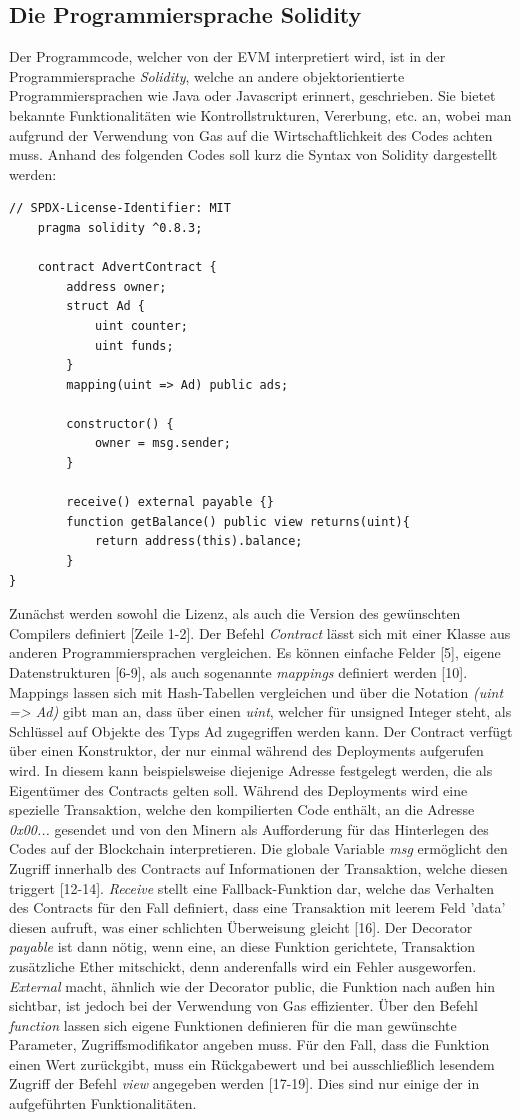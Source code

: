 \subsection{Die Programmiersprache Solidity}
Der Programmcode, welcher von der EVM interpretiert wird, ist in der Programmiersprache \emph{Solidity}, welche an andere objektorientierte Programmiersprachen wie Java oder Javascript erinnert, geschrieben. Sie bietet bekannte Funktionalitäten wie Kontrollstrukturen, Vererbung, etc. an, wobei man aufgrund der Verwendung von Gas auf die Wirtschaftlichkeit des Codes achten muss. Anhand des folgenden Codes soll kurz die Syntax von Solidity dargestellt werden: 
\begin{lstlisting}[caption={Beispielcode für Solidity},captionpos=b]
	// SPDX-License-Identifier: MIT
	pragma solidity ^0.8.3;
	
	contract AdvertContract {
		address owner;
		struct Ad {
			uint counter;
			uint funds;
		}
		mapping(uint => Ad) public ads;
		
		constructor() {
			owner = msg.sender;
		}
	
		receive() external payable {}
		function getBalance() public view returns(uint){
			return address(this).balance;
		}
}
	\end{lstlisting}
Zunächst werden sowohl die Lizenz, als auch die Version des gewünschten Compilers definiert [Zeile 1-2]. Der Befehl \emph{Contract} lässt sich mit einer Klasse aus anderen Programmiersprachen vergleichen. 
Es können einfache Felder [5], eigene Datenstrukturen [6-9], als auch sogenannte \emph{mappings} definiert werden [10]. Mappings lassen sich mit Hash-Tabellen vergleichen und über die Notation \emph{(uint => Ad)} gibt man an, dass über einen \emph{uint}, welcher für unsigned Integer steht, als Schlüssel auf Objekte des Typs Ad zugegriffen werden kann. 
Der Contract verfügt über einen Konstruktor, der nur einmal während des Deployments aufgerufen wird. In diesem kann beispielsweise diejenige Adresse festgelegt werden, die als Eigentümer des Contracts gelten soll. 
Während des Deployments wird eine spezielle Transaktion, welche den kompilierten Code enthält, an die Adresse \emph{0x00...} gesendet und von den Minern als Aufforderung für das Hinterlegen des Codes auf der Blockchain interpretieren. 
Die globale Variable \emph{msg} ermöglicht den Zugriff innerhalb des Contracts auf Informationen der Transaktion, welche diesen triggert [12-14].
\emph{Receive} stellt eine Fallback-Funktion dar, welche das Verhalten des Contracts für den Fall definiert, dass eine Transaktion mit leerem Feld 'data' diesen aufruft, was einer schlichten Überweisung gleicht [16]. Der Decorator \emph{payable} ist dann nötig, wenn eine, an diese Funktion gerichtete, Transaktion zusätzliche Ether mitschickt, denn anderenfalls wird ein Fehler ausgeworfen. \emph{External} macht, ähnlich wie der Decorator public, die Funktion nach außen hin sichtbar, ist jedoch bei der Verwendung von Gas effizienter. Über den Befehl \emph{function} lassen sich eigene Funktionen definieren für die man gewünschte Parameter, Zugriffsmodifikator angeben muss. Für den Fall, dass die Funktion einen Wert zurückgibt, muss ein Rückgabewert und bei ausschließlich lesendem Zugriff der Befehl \emph{view} angegeben werden [17-19]. Dies sind nur einige der in \cite{solidity_2021} aufgeführten Funktionalitäten.
